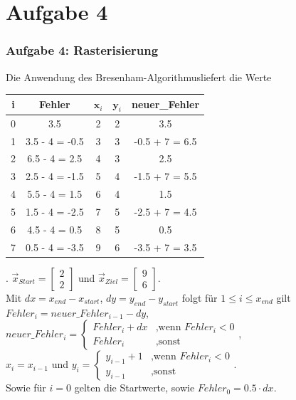 \documentclass[accentcolor=tud9c,colorbacktitle,inverttitle,landscape,german,presentation,t]{tudbeamer}
\begin{document}
\section{Aufgabe 4}
	\begin{frame}
		\frametitle{Aufgabe 4: Rasterisierung} 
		Die Anwendung des Bresenham-Algorithmusliefert die Werte
		\begin{tabular}{c*{4}{|c}}%
			\textbf{i} & \textbf{Fehler} & $\textbf{x}_{i}$ & $\textbf{y}_{i}$ & \textbf{neuer\_Fehler} \\
			 & 3.5 & 2 & 2 & 3.5\\
			1 & 3.5 - 4 = -0.5 & 3 & 3 & -0.5 + 7 = 6.5\\
			2 & 6.5 - 4 = 2.5 & 4 & 3 & 2.5\\
			3 & 2.5 - 4 = -1.5 & 5 & 4 & -1.5 + 7 = 5.5\\
			4 & 5.5 - 4 = 1.5 & 6 & 4 & 1.5\\
			5 & 1.5 - 4 = -2.5 & 7 & 5 & -2.5 + 7 = 4.5\\
			6 & 4.5 - 4 = 0.5 & 8 & 5 & 0.5\\
			7 & 0.5 - 4 = -3.5 & 9 & 6 & -3.5 + 7 = 3.5\\
			\hline 
		\end{tabular}. 
	$\vec{x}_{Start} =
	\begin{bmatrix}
	2 \\ 2
	\end{bmatrix}
	 $ und
	 $\vec{x}_{Ziel} =
	 \begin{bmatrix}
	 9 \\ 6
	 \end{bmatrix}
	 $.\\
	{\tiny 
		Mit	$dx=x_{end} - x_{start}$, 
		$dy=y_{end} - y_{start}$ folgt für  $1\leq i \leq x_{end}$ gilt \\		 
		$Fehler_{i}=neuer\_Fehler_{i-1} - dy$, 
		$neuer\_Fehler_{i}=
		\begin{cases}
		Fehler_{i}+dx & \text{,wenn }Fehler_{i} < 0 \\
		Fehler_{i} & \text{,sonst}
		\end{cases}$,\\
		$x_{i}=x_{i-1}$ und 
		$y_{i} = 
		\begin{cases}
		y_{i-1}+1 & \text{,wenn }Fehler_{i} < 0 \\
		y_{i-1} & \text{,sonst}
		\end{cases}$.\\
		Sowie für $i=0$ gelten die Startwerte, sowie $Fehler_{0}=0.5 \cdot dx$.}
	\end{frame}
\end{document}
